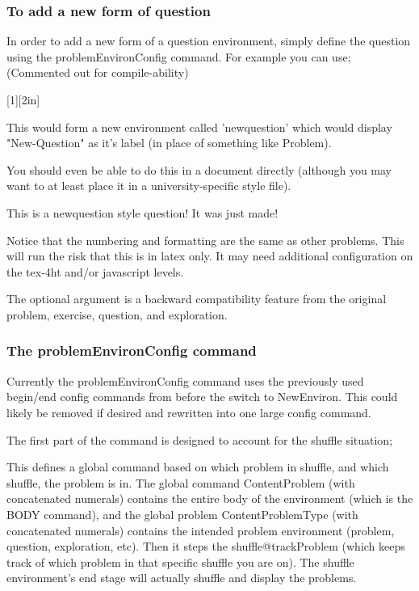 \documentclass{ximera}
\begin{document}
		\subsubsection{To add a new form of question}
		In order to add a new form of a question environment, simply define the question using the problemEnvironConfig command. For example you can use; (Commented out for compile-ability)
		
		[1][2in]
		{
		}
		
		This would form a new environment called 'newquestion' which would display "New-Question" as it's label (in place of something like Problem).
		
		You should even be able to do this in a document directly (although you may want to at least place it in a university-specific style file).
		
		\begin{newquestion}
		This is a newquestion style question! It was just made!
		\end{newquestion}
		
		Notice that the numbering and formatting are the same as other problems. This will run the risk that this is in latex only. It may need additional configuration on the tex-4ht and/or javascript levels.
		
		The optional argument is a backward compatibility feature from the original problem, exercise, question, and exploration.
		
		\subsubsection{The problemEnvironConfig command}
		Currently the problemEnvironConfig command uses the previously used begin/end config commands from before the switch to NewEnviron. This could likely be removed if desired and rewritten into one large config command.
		
		The first part of the command is designed to account for the shuffle situation;
		
		This defines a global command based on which problem in shuffle, and which shuffle, the problem is in. The global command ContentProblem (with concatenated numerals) contains the entire body of the environment (which is the BODY command), and the global problem ContentProblemType (with concatenated numerals) contains the intended problem environment (problem, question, exploration, etc). Then it steps the shuffle@trackProblem (which keeps track of which problem in that specific shuffle you are on). The shuffle environment's end stage will actually shuffle and display the problems.
		
\end{document}
